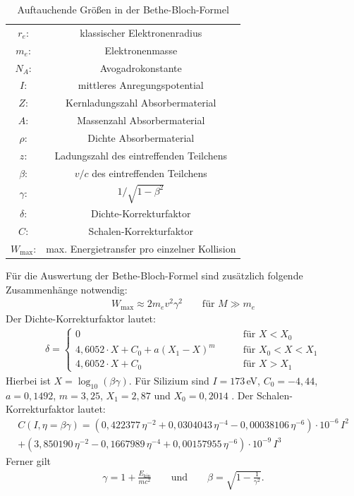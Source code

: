 \begin{table}[h]
	\centering
	\caption{Auftauchende Größen in der Bethe-Bloch-Formel}
	\begin{tabular}{cc}
		$r_e$: & klassischer Elektronenradius \\
		$m_e$: & Elektronenmasse \\
		$N_A$: & Avogadrokonstante \\
		$I$:  & mittleres Anregungspotential \\
		$Z$:  & Kernladungszahl Absorbermaterial \\
		$A$:  & Massenzahl Absorbermaterial \\
		$\rho$: & Dichte Absorbermaterial \\
		$z$:  & Ladungszahl des eintreffenden Teilchens \\
		$\beta$: & $v/c$ des eintreffenden Teilchens \\
		$\gamma$: & $1/\sqrt{1-\beta^2}$ \\
		$\delta$: & Dichte-Korrekturfaktor \\
		$C$:  & Schalen-Korrekturfaktor \\
		$W_\text{max}$: & max. Energietransfer pro einzelner Kollision \\
	\end{tabular}%
	\label{tab:bethebloch}%
\end{table}%

Für die Auswertung der Bethe-Bloch-Formel sind zusätzlich folgende Zusammenhänge notwendig:
\begin{align}
	W_\text{max}\approx 2m_ev^2\gamma^2\qquad\text{für }M\gg m_e
\end{align}
Der Dichte-Korrekturfaktor lautet:
\begin{align}
	\delta=\begin{cases}
	0 &\qquad\text{für }X<X_0\\
	4,6052\cdot X + C_0 + a(X_1-X)^m &\qquad\text{für }X_0<X<X_1\\
	4,6052\cdot X + C_0  &\qquad\text{für }X>X_1
	\end{cases}
\end{align}
Hierbei ist $X=\log_{10}(\beta \gamma)$. Für Silizium sind $I=173\,$eV, $C_0=-4,44$, $a=0,1492$, $m=3,25$, $X_1=2,87$ und $X_0=0,2014$ \cite{bethebloch}. Der  Schalen-Korrekturfaktor lautet:
\begin{align}
	C(I,\eta=\beta\gamma)=(0,422377\,\eta^{-2}+0,0304043\,\eta^{-4}-0,00038106\,\eta^{-6})\cdot 10^{-6}\,I^2 \nonumber\\
	+(3,850190\,\eta^{-2}-0,1667989\,\eta^{-4}+0,00157955\,\eta^{-6})\cdot 10^{-9}\,I^3
\end{align}
Ferner gilt
\begin{align}
	\gamma = 1 + \frac{E_\text{kin}}{mc^2}\qquad\text{und}\qquad\beta=\sqrt{1-\frac{1}{\gamma^2}}.
\end{align}

